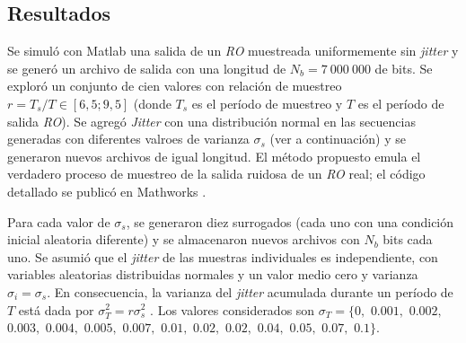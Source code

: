 \subsection{Resultados}
\label{sec:resu}

Se simuló con Matlab una salida de un \emph{RO} muestreada uniformemente sin \textit{jitter} y se generó un archivo de salida con una longitud de $N_b = 7~000~000$ de bits.
Se exploró un conjunto de cien valores con relación de muestreo $r = T_s/T \in [6,5; 9,5]$ (donde $T_s$ es el período de muestreo y $T$ es el período de salida \emph{RO}).
Se agregó \textit{Jitter} con una distribución normal en las secuencias generadas con diferentes valroes de varianza $\sigma_s$ (ver a continuación) y se generaron nuevos archivos de igual longitud.
El método propuesto emula el verdadero proceso de muestreo de la salida ruidosa de un \emph{RO} real; el código detallado se publicó en Mathworks \cite{MathworksMaxi}.

Para cada valor de $\sigma_s$, se generaron diez surrogados (cada uno con una condición inicial aleatoria diferente) y se almacenaron nuevos archivos con $N_b$ bits cada uno. Se asumió que el \textit{jitter} de las muestras individuales es independiente, con variables aleatorias distribuidas normales y un valor medio cero y varianza $\sigma_i = \sigma_s$.
En consecuencia, la varianza del \textit{jitter} acumulada durante un período de $T$ está dada por $\sigma^2_T = r \sigma^2_s $ \cite{Valtchanov2008}.
Los valores considerados son $\sigma_T=\{0,$ $0.001,$ $0.002,$ $0.003,$ $0.004,$ $0.005,$ $0.007,$ $0.01,$ $0.02,$ $0.02,$ $0.04,$ $0.05,$ $0.07,$ $0.1\}$.

